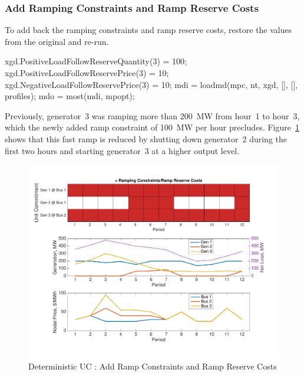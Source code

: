 \documentclass[12pt]{article}
\newcommand{\code}[1]{{\relsize{-0.5}{\tt{{#1}}}}}  %
\numberwithin{equation}{section}
\numberwithin{table}{section}
\numberwithin{figure}{section}
\begin{document}
\subsubsection*{Add Ramping Constraints and Ramp Reserve Costs}
To add back the ramping constraints and ramp reserve costs, restore the values from the original \code{xGenData} and re-run.
\begin{Code}
xgd.PositiveLoadFollowReserveQuantity(3) = 100; %
xgd.PositiveLoadFollowReservePrice(3) = 10;     %
xgd.NegativeLoadFollowReservePrice(3) = 10;
mdi = loadmd(mpc, nt, xgd, [], [], profiles);
mdo = most(mdi, mpopt);
\end{Code}
Previously, generator~3 was ramping more than 200~MW from hour~1 to hour~3, which the newly added ramp constraint of 100~MW per hour precludes.
Figure~\ref{fig:uc_ex_5} shows that this fast ramp is reduced by shutting down generator~2 during the first two hours and starting generator~3 at a higher output level.
\begin{figure}[hbtp]
  \centering
  \includegraphics[width=\textwidth]{./figures/uc-ex-5}
  \caption{Deterministic UC : Add Ramp Constraints and Ramp Reserve Costs}
  \label{fig:uc_ex_5}
\end{figure}
\end{document}
